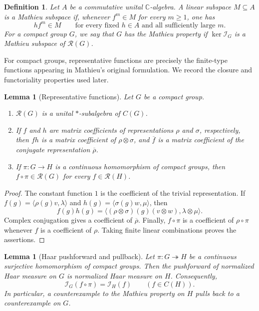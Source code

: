 \documentclass[11pt]{article}
\numberwithin{equation}{section}
\newtheorem{lemma}[theorem]{Lemma}
\newtheorem{definition}[theorem]{Definition}
\newcommand{\C}{\mathbb C}
\newcommand{\cR}{\mathcal R}
\newcommand{\cI}{\mathcal I}
\newcommand{\ip}[2]{\langle #1,#2\rangle}
\begin{document}
\begin{definition}\label{def:mathieu-subspace}
Let $A$ be a commutative unital $\C$-algebra.  A linear subspace $M\subseteq A$
is a \emph{Mathieu subspace} if, whenever $f^m\in M$ for every $m\geq1$, one
has
\[
 hf^m\in M
 \qquad\text{for every fixed }h\in A\text{ and all sufficiently large }m.
\]
For a compact group $G$, we say that $G$ has the Mathieu property if
$\ker\cI_G$ is a Mathieu subspace of $\cR(G)$.
\end{definition}

For compact groups, representative functions are precisely the finite-type
functions appearing in Mathieu's original formulation.  We record the
closure and functoriality properties used later.

\begin{lemma}[Representative functions]\label{lem:representative-algebra}
Let $G$ be a compact group.
\begin{enumerate}[label=\textup{(\roman*)}]
\item $\cR(G)$ is a unital $*$-subalgebra of $C(G)$.
\item If $f$ and $h$ are matrix coefficients of representations $\rho$ and
$\sigma$, respectively, then $fh$ is a matrix coefficient of
$\rho\otimes\sigma$, and $\overline f$ is a matrix coefficient of the
conjugate representation $\overline\rho$.
\item If $\pi:G\to H$ is a continuous homomorphism of compact groups, then
$f\circ\pi\in\cR(G)$ for every $f\in\cR(H)$.
\end{enumerate}
\end{lemma}

\begin{proof}
The constant function $1$ is the coefficient of the trivial representation.
If
$f(g)=\ip{\rho(g)v}{\lambda}$ and
$h(g)=\ip{\sigma(g)w}{\mu}$, then
\[
 f(g)h(g)
 =\ip{(\rho\otimes\sigma)(g)(v\otimes w)}{\lambda\otimes\mu}.
\]
Complex conjugation gives a coefficient of $\overline\rho$.  Finally,
$f\circ\pi$ is a coefficient of $\rho\circ\pi$ whenever $f$ is a coefficient
of $\rho$.  Taking finite linear combinations proves the assertions.
\end{proof}

\begin{lemma}[Haar pushforward and pullback]\label{lem:haar-pullback}
Let $\pi:G\twoheadrightarrow H$ be a continuous surjective homomorphism of
compact groups.  Then the pushforward of normalized Haar measure on $G$ is
normalized Haar measure on $H$.  Consequently,
\begin{equation}\label{eq:haar-pullback}
 \cI_G(f\circ\pi)=\cI_H(f)
 \qquad(f\in C(H)).
\end{equation}
In particular, a counterexample to the Mathieu property on $H$ pulls back to
a counterexample on $G$.
\end{lemma}
\end{document}
